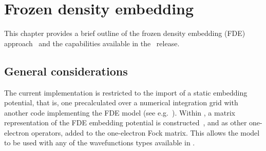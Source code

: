\chapter{Frozen density embedding}\label{ch:fde-embedding}


This chapter provides a brief outline of the frozen density embedding (FDE) approach~\cite{env-gomes-arpcspc2012-108-222,Jacob2013} and
the capabilities available in the \latestrelease\ release.  

\begin{center}
\end{center} 
\section{General considerations}

The current implementation is restricted to the import of a static embedding potential, that is, one 
precalculated over a numerical integration grid with another code implementing the FDE model (see e.g.~\cite{env-Hofener-JCP2012-136-044104,Jacob2011}). 
Within {\dalton}, a matrix representation of the FDE embedding potential is constructed~\cite{actinide-Gomes-PCCP2008-10-5353}, and 
as other one-electron operators, added to the one-electron Fock matrix. This allows the model to be used with 
any of the wavefunctions types available in {\dalton}.

